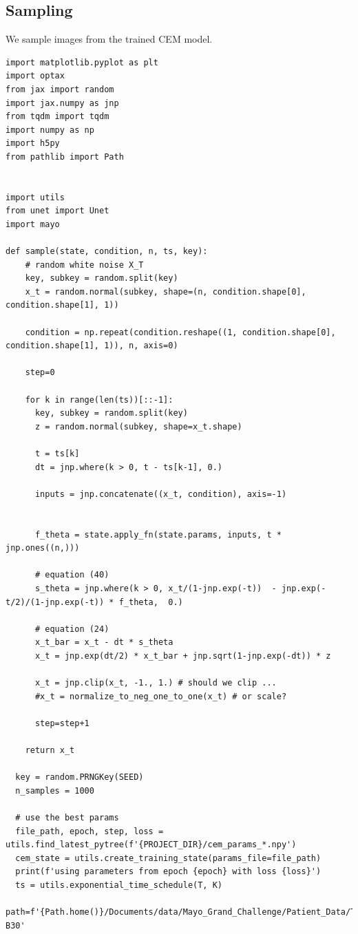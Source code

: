 \documentclass[a4paper, 11pt]{article}
\begin{document}
\subsection{Sampling}
\label{sec:org5310912}
We sample images from the trained CEM model.
\begin{verbatim}
import matplotlib.pyplot as plt
import optax
from jax import random
import jax.numpy as jnp
from tqdm import tqdm
import numpy as np
import h5py
from pathlib import Path


import utils
from unet import Unet
import mayo

def sample(state, condition, n, ts, key):
    # random white noise X_T
    key, subkey = random.split(key)
    x_t = random.normal(subkey, shape=(n, condition.shape[0], condition.shape[1], 1))

    condition = np.repeat(condition.reshape((1, condition.shape[0], condition.shape[1], 1)), n, axis=0)

    step=0

    for k in range(len(ts))[::-1]:
      key, subkey = random.split(key)
      z = random.normal(subkey, shape=x_t.shape)

      t = ts[k]
      dt = jnp.where(k > 0, t - ts[k-1], 0.)

      inputs = jnp.concatenate((x_t, condition), axis=-1)


      f_theta = state.apply_fn(state.params, inputs, t * jnp.ones((n,)))

      # equation (40)
      s_theta = jnp.where(k > 0, x_t/(1-jnp.exp(-t))  - jnp.exp(-t/2)/(1-jnp.exp(-t)) * f_theta,  0.)

      # equation (24)
      x_t_bar = x_t - dt * s_theta
      x_t = jnp.exp(dt/2) * x_t_bar + jnp.sqrt(1-jnp.exp(-dt)) * z

      x_t = jnp.clip(x_t, -1., 1.) # should we clip ...
      #x_t = normalize_to_neg_one_to_one(x_t) # or scale?

      step=step+1

    return x_t

  key = random.PRNGKey(SEED)
  n_samples = 1000

  # use the best params
  file_path, epoch, step, loss = utils.find_latest_pytree(f'{PROJECT_DIR}/cem_params_*.npy')
  cem_state = utils.create_training_state(params_file=file_path)
  print(f'using parameters from epoch {epoch} with loss {loss}')
  ts = utils.exponential_time_schedule(T, K)
  path=f'{Path.home()}/Documents/data/Mayo_Grand_Challenge/Patient_Data/Training_Image_Data/3mm B30'


\end{verbatim}
\end{document}
